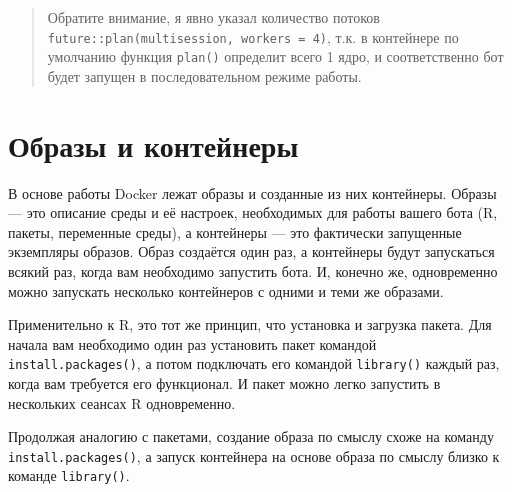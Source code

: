 \documentclass[
]{book}
\newenvironment{Shaded}{\begin{snugshade}}{\end{snugshade}}
\newcommand{\CommentTok}[1]{\textcolor[rgb]{0.56,0.35,0.01}{\textit{#1}}}
\newcommand{\FunctionTok}[1]{\textcolor[rgb]{0.13,0.29,0.53}{\textbf{#1}}}
\newcommand{\NormalTok}[1]{#1}
\newcommand{\OtherTok}[1]{\textcolor[rgb]{0.56,0.35,0.01}{#1}}
\newcommand{\SpecialCharTok}[1]{\textcolor[rgb]{0.81,0.36,0.00}{\textbf{#1}}}
\newcommand{\StringTok}[1]{\textcolor[rgb]{0.31,0.60,0.02}{#1}}
\begin{document}
\begin{Shaded}
\end{Shaded}

\begin{quote}
Обратите внимание, я явно указал количество потоков \texttt{future::plan(\textquotesingle{}multisession\textquotesingle{},\ workers\ =\ 4)}, т.к. в контейнере по умолчанию функция \texttt{plan()} определит всего 1 ядро, и соответственно бот будет запущен в последовательном режиме работы.
\end{quote}

\section{Образы и контейнеры}\label{ux43eux431ux440ux430ux437ux44b-ux438-ux43aux43eux43dux442ux435ux439ux43dux435ux440ux44b}

В основе работы Docker лежат образы и созданные из них контейнеры. Образы --- это описание среды и её настроек, необходимых для работы вашего бота (R, пакеты, переменные среды), а контейнеры --- это фактически запущенные экземпляры образов. Образ создаётся один раз, а контейнеры будут запускаться всякий раз, когда вам необходимо запустить бота. И, конечно же, одновременно можно запускать несколько контейнеров с одними и теми же образами.

Применительно к R, это тот же принцип, что установка и загрузка пакета. Для начала вам необходимо один раз установить пакет командой \texttt{install.packages()}, а потом подключать его командой \texttt{library()} каждый раз, когда вам требуется его функционал. И пакет можно легко запустить в нескольких сеансах R одновременно.

Продолжая аналогию с пакетами, создание образа по смыслу схоже на команду \texttt{install.packages()}, а запуск контейнера на основе образа по смыслу близко к команде \texttt{library()}.
\end{document}
